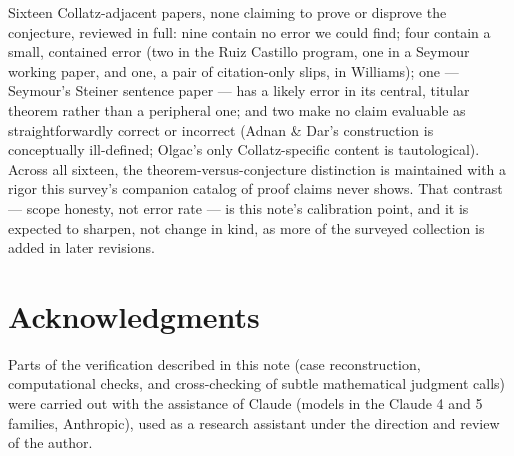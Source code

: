 \documentclass[11pt]{article}
\begin{document}
Sixteen Collatz-adjacent papers, none claiming to prove or disprove the
conjecture, reviewed in full: nine contain no error we could find; four
contain a small, contained error (two in the Ruiz Castillo program, one
in a Seymour working paper, and one, a pair of citation-only slips, in
Williams); one --- Seymour's Steiner sentence paper --- has a likely
error in its central, titular theorem rather than a peripheral one; and
two make no claim evaluable as straightforwardly correct or incorrect
(Adnan \& Dar's construction is conceptually ill-defined; Olgac's only
Collatz-specific content is tautological). Across all sixteen, the
theorem-versus-conjecture distinction is maintained with a rigor this
survey's
companion catalog of proof claims never shows. That contrast --- scope
honesty, not error rate --- is this note's calibration point, and it is
expected to sharpen, not change in kind, as more of the surveyed
collection is added in later revisions.

\section*{Acknowledgments}

Parts of the verification described in this note (case reconstruction,
computational checks, and cross-checking of subtle mathematical
judgment calls) were carried out with the assistance of Claude (models
in the Claude 4 and 5 families, Anthropic), used as a research
assistant under the direction and review of the author.
\end{document}
